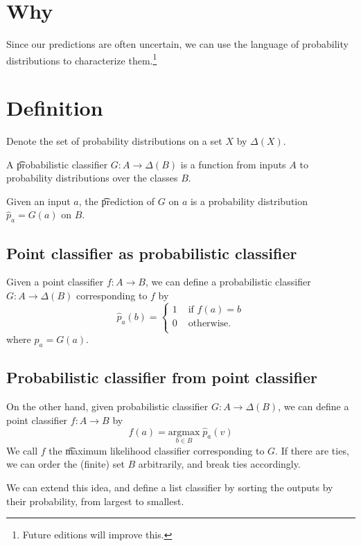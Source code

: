 

\section*{Why}

Since our predictions are often uncertain, we can use the language of probability distributions to characterize them.\footnote{Future editions will improve this.}

\section*{Definition}

Denote the set of probability distributions on a set $X$ by $\Delta(X)$.

A \t{probabilistic classifier} $G: A \to \Delta(B)$ is a function from inputs $A$ to probability distributions over the classes $B$.

Given an input $a$, the \t{prediction} of $G$ on $a$ is a probability distribution $\hat{p}_a = G(a)$ on $B$.

\subsection*{Point classifier as probabilistic classifier}

Given a point classifier $f: A \to B$, we can define a probabilistic classifier $G: A \to \Delta(B)$ corresponding to $f$ by
\[
\hat{p}_a(b) =
\begin{cases}
1 & \text{ if } f(a) = b \\
0 & \text{ otherwise.} \\
\end{cases}
\]
where $\hat{p}_a = G(a).$

\subsection*{Probabilistic classifier from point classifier}

On the other hand, given probabilistic classifier $G: A \to \Delta(B)$, we can define a point classifier $f: A \to B$ by
\[
f(a) = \underset{b \in B}{\text{argmax}} \; \hat{p}_a(v)
\]
We call $f$ the \t{maximum likelihood classifier} corresponding to $G$.
If there are ties, we can order the (finite) set $B$ arbitrarily, and break ties accordingly.

We can extend this idea, and define a list classifier by sorting the outputs by their probability, from largest to smallest.

\blankpage